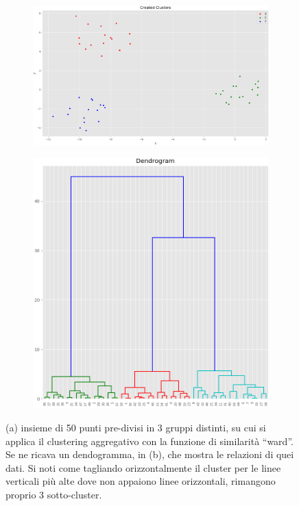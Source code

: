 \documentclass{llncs}
\begin{document}
	\begin{figure}[h]
		\centering
		\begin{subfigure}[b]{\textwidth}
		   	\includegraphics[width=\linewidth]{immagini/created_cluster_dend_ex.png}
		   	\label{fig:1} 
		\end{subfigure}
		
		\begin{subfigure}[b]{\textwidth}
			\centering
		   	\includegraphics[scale=0.5]{immagini/dendrogam_example.png}
		   	\label{fig:2}
		\end{subfigure}
		
		\caption{(a) insieme di 50 punti pre-divisi in 3 gruppi distinti, su cui si applica il clustering aggregativo con la funzione di 
		similarità ``ward''. Se ne ricava un dendogramma, in (b), che mostra le relazioni di quei dati. Si noti come tagliando orizzontalmente il cluster per le linee verticali più alte dove non appaiono linee orizzontali, rimangono proprio 3 sotto-cluster.}
		\label{ex:dendrogram}
	\end{figure}
\end{document}
